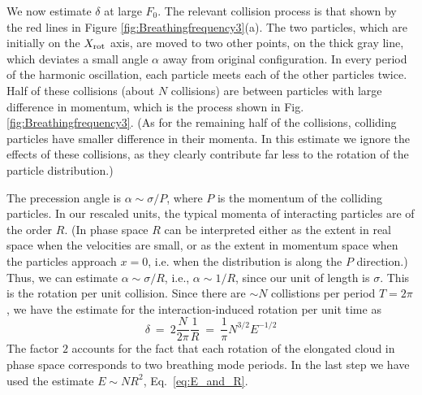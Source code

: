 \documentclass[a4paper, onecolumn]{revtex4-1}
\begin{document}
We now estimate $\delta$ at large $F_0$.  The relevant collision process is that shown by the red
lines in Figure \ref{fig:Breathingfrequency3}(a).  The two particles, which are initially on the
$X_{\rm rot}$ axis, are moved to two other points, on the thick gray line, which deviates a small
angle $\alpha$ away from original configuration.  In every period of the harmonic oscillation, each
particle meets each of the other particles twice.  Half of these collisions (about $N$ collisions)
are between particles with large difference in momentum, which is the process shown in
Fig.\ref{fig:Breathingfrequency3}.  (As for the remaining half of the collisions, colliding
particles have smaller difference in their momenta.  In this estimate we ignore the effects of these
collisions, as they clearly contribute far less to the rotation of the particle distribution.)

The precession angle is $\alpha\sim \sigma/P$, where $P$ is the momentum of the colliding particles.
In our rescaled units, the typical momenta of interacting particles are of the order $R$.  (In phase
space $R$ can be interpreted either as the extent in real space when the velocities are small, or as
the extent in momentum space when the particles approach $x=0$, i.e. when the distribution is along
the $P$ direction.)  Thus, we can estimate $\alpha\sim \sigma/R$, i.e., $\alpha\sim 1/R$, since our
unit of length is $\sigma$.  This is the rotation per unit collision.  Since there are $\sim N$
collistions per period $T=2\pi$, we have the estimate for the interaction-induced rotation per unit
time as
\begin{equation}
\delta ~=~ 2 \frac{N}{2\pi} \frac{1}{R} ~=~  \frac{1}{\pi}  N^{3/2}E^{-1/2}
\label{eq:breathingfrequency1}
\end{equation}
The factor $2$ accounts for the fact that each rotation of the elongated cloud in phase space
corresponds to two breathing mode periods.  In the last step we have used the estimate $E\sim
NR^2$, Eq.\ \eqref{eq:E_and_R}. 
\end{document}
